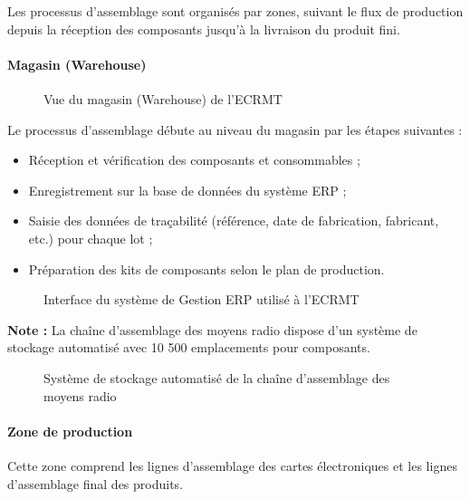 Les processus d’assemblage sont organisés par zones, suivant le flux de production depuis la réception des composants jusqu’à la livraison du produit fini.

\paragraph{Magasin (Warehouse)}

\begin{figure}[H]
    \centering
    \caption{Vue du magasin (Warehouse) de l'ECRMT}
    \label{fig:magasin}
\end{figure}

Le processus d'assemblage débute au niveau du magasin par les étapes suivantes :
\begin{itemize}
    \item Réception et vérification des composants et consommables ;
    \item Enregistrement sur la base de données du système ERP ;
    \item Saisie des données de traçabilité (référence, date de fabrication, fabricant, etc.) pour chaque lot ;
    \item Préparation des kits de composants selon le plan de production.
\end{itemize}

\begin{figure}[H]
    \centering
    \caption{Interface du système de Gestion ERP utilisé à l'ECRMT}
    \label{fig:erp_interface}
\end{figure}

\textbf{Note :} La chaîne d'assemblage des moyens radio dispose d'un système de stockage automatisé avec 10 500 emplacements pour composants.

\begin{figure}[H]
    \centering
    \caption{Système de stockage automatisé de la chaîne d'assemblage des moyens radio}
    \label{fig:stockage_auto}
\end{figure}

\paragraph{Zone de production}

Cette zone comprend les lignes d'assemblage des cartes électroniques et les lignes d'assemblage final des produits.

